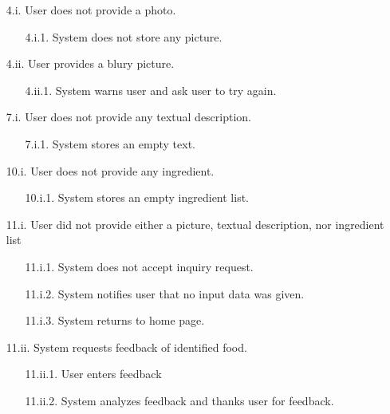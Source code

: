 \documentclass[]{article}
\begin{document}
\begin{enumerate}[{\bf BE1.}]
\begin{enumerate}[{\bf VP1.}]
\begin{enumerate}
					\item[4.i.] User does not provide a photo.
					\begin{enumerate}
						\item[4.i.1.] System does not store any picture.
					\end{enumerate}
					\item[4.ii.] User provides a blury picture.
					\begin{enumerate}
						\item[4.ii.1.] System warns user and ask user to try again.
					\end{enumerate}
				\end{enumerate}
				\begin{enumerate}
					\item[7.i.] User does not provide any textual description.
					\begin{enumerate}
						\item[7.i.1.] System stores an empty text.
					\end{enumerate}
				\end{enumerate}
				\begin{enumerate}
					\item[10.i.] User does not provide any ingredient.
					\begin{enumerate}
						\item[10.i.1.] System stores an empty ingredient list.
					\end{enumerate}
				\end{enumerate}
				\begin{enumerate}
					\item[11.i.] User did not provide either a picture, textual description, nor ingredient list
					\begin{enumerate}
						\item[11.i.1.] System does not accept inquiry request.
						\item[11.i.2.] System notifies user that no input data was given.
						\item[11.i.3.] System returns to home page.
					\end{enumerate}
					\item[11.ii.] System requests feedback of identified food.
					\begin{enumerate}
						\item[11.ii.1.] User enters feedback
						\item[11.ii.2.] System analyzes feedback and thanks user for feedback.
					\end{enumerate}
				\end{enumerate}


\end{enumerate}
\end{enumerate}
\end{document}
